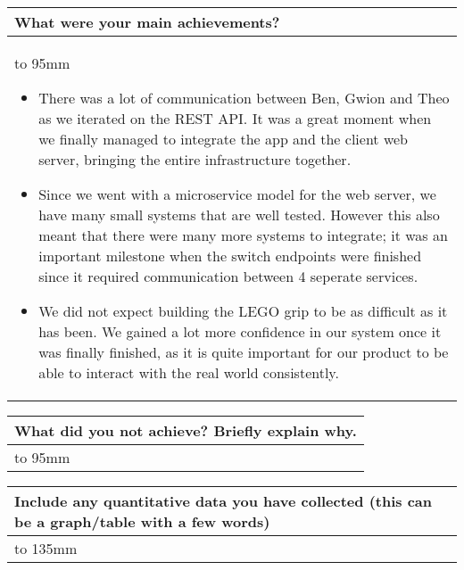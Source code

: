 \documentclass[a4paper]{article}
\newcommand{\colWidth}{141mm}
\begin{document}
\begin{center}
\begin{tabular}{|p{\colWidth}|}
	\hline
	\cellcolor{blue!25}\large
	\textbf{What were your main achievements?}
	\\ \hline
	\vtop to 95mm{
		\begin{itemize}
			\item There was a lot of communication between Ben, Gwion and Theo as we iterated on the REST API. It was a great moment when we finally managed to integrate the app and the client web server, bringing the entire infrastructure together.
			\item Since we went with a microservice model for the web server, we have many small systems that are well tested. However this also meant that there were many more systems to integrate; it was an important milestone when the switch endpoints were finished since it required communication between 4 seperate services.
			\item We did not expect building the LEGO grip to be as difficult as it has been. We gained a lot more confidence in our system once it was finally finished, as it is quite important for our product to be able to interact with the real world consistently.
		\end{itemize}
	}
  \\
  \hline
\end{tabular}
\vskip 5mm


\begin{tabular}{|p{\colWidth}|}
	\hline
	\cellcolor{blue!25}\large
	\textbf{What did you not achieve? Briefly explain why.}
	\\ \hline
	\vtop to 95mm{
  }
  \\
  \hline
\end{tabular}
\vskip 5mm


\begin{tabular}{|p{\colWidth}|}
	\hline
	\cellcolor{blue!25}\large
	\textbf{Include any quantitative data you have collected (this can be a graph/table with a few words)}
	\\ \hline
	\vtop to 135mm{
  }
  \\
  \hline
\end{tabular}
\vskip 5mm



\end{center}
\end{document}
